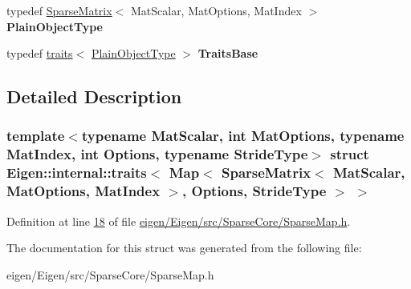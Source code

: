 \begin{DoxyCompactItemize}
typedef \hyperlink{group___sparse_core___module_class_eigen_1_1_sparse_matrix}{Sparse\+Matrix}$<$ Mat\+Scalar, Mat\+Options, Mat\+Index $>$ {\bfseries Plain\+Object\+Type}
\item 
\mbox{\label{struct_eigen_1_1internal_1_1traits_3_01_map_3_01_sparse_matrix_3_01_mat_scalar_00_01_mat_optionsc906e4e1b3a968ac003455586a92664c_a515426d8fed72750e4815acd12da5aa0}} 
typedef \hyperlink{struct_eigen_1_1internal_1_1traits}{traits}$<$ \hyperlink{group___sparse_core___module_class_eigen_1_1_sparse_matrix}{Plain\+Object\+Type} $>$ {\bfseries Traits\+Base}
\end{DoxyCompactItemize}


\subsection{Detailed Description}
\subsubsection*{template$<$typename Mat\+Scalar, int Mat\+Options, typename Mat\+Index, int Options, typename Stride\+Type$>$\newline
struct Eigen\+::internal\+::traits$<$ Map$<$ Sparse\+Matrix$<$ Mat\+Scalar, Mat\+Options, Mat\+Index $>$, Options, Stride\+Type $>$ $>$}



Definition at line \hyperlink{eigen_2_eigen_2src_2_sparse_core_2_sparse_map_8h_source_l00018}{18} of file \hyperlink{eigen_2_eigen_2src_2_sparse_core_2_sparse_map_8h_source}{eigen/\+Eigen/src/\+Sparse\+Core/\+Sparse\+Map.\+h}.



The documentation for this struct was generated from the following file\+:\begin{DoxyCompactItemize}
\item 
eigen/\+Eigen/src/\+Sparse\+Core/\+Sparse\+Map.\+h\end{DoxyCompactItemize}
